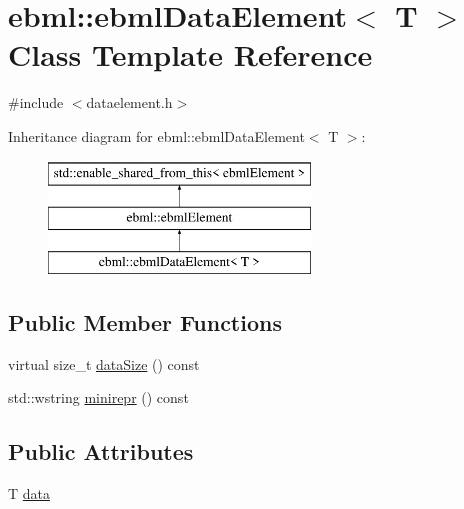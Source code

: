 \hypertarget{classebml_1_1ebmlDataElement}{}\section{ebml\+:\+:ebml\+Data\+Element$<$ T $>$ Class Template Reference}
\label{classebml_1_1ebmlDataElement}


{\ttfamily \#include $<$dataelement.\+h$>$}

Inheritance diagram for ebml\+:\+:ebml\+Data\+Element$<$ T $>$\+:\begin{figure}[H]
\begin{center}
\leavevmode
\includegraphics[height=3.000000cm]{classebml_1_1ebmlDataElement}
\end{center}
\end{figure}
\subsection*{Public Member Functions}
\begin{DoxyCompactItemize}
\item 
virtual size\+\_\+t \mbox{\hyperlink{classebml_1_1ebmlDataElement_add3cc3627008b8139a054a3a0696bc2d}{data\+Size}} () const
\item 
std\+::wstring \mbox{\hyperlink{classebml_1_1ebmlDataElement_a721eb3bfcb545510f2cebad65776f1bd}{minirepr}} () const
\end{DoxyCompactItemize}
\subsection*{Public Attributes}
\begin{DoxyCompactItemize}
\item 
T \mbox{\hyperlink{classebml_1_1ebmlDataElement_aa0b68d39cf69e0a34ba7bb1d8368a386}{data}}
\end{DoxyCompactItemize}
